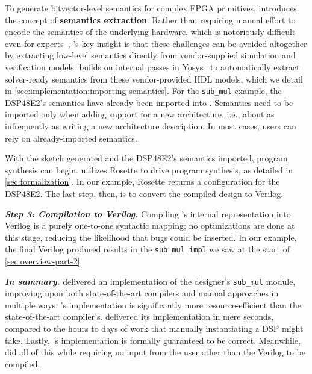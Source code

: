 To generate bitvector-level semantics
  for complex FPGA primitives,
  \lr introduces the concept of
  \textbf{semantics extraction}.
Rather than requiring
  manual effort to encode the semantics
  of the underlying hardware,
  which is notoriously difficult
  even for experts~\cite{Bernstein2021WhatAT},
  \lr's key insight is that these challenges
  can be avoided altogether
  by extracting low-level semantics
  directly from
  vendor-supplied simulation and verification models.
\lr builds on internal passes in 
  Yosys~\cite{wolf2013yosys} 
  to automatically extract
  solver-ready semantics from these vendor-provided HDL models,
  which we detail in \cref{sec:implementation:importing-semantics}.
For the
  \texttt{sub\_mul} example,
  the DSP48E2's semantics have already been imported into \lr.
Semantics need to be imported only when
  adding support for a new architecture, i.e., %
  about as infrequently
  as writing a new architecture description.
In most cases,
  \lr users can rely on already-imported semantics.
  
With the sketch generated
  and the DSP48E2's semantics imported,
  program synthesis can begin.
\lr utilizes Rosette to drive program synthesis,
  as detailed in \cref{sec:formalization}.
In our example, Rosette returns
  a configuration for the DSP48E2.
The last step, then, is to convert
  the compiled design
  to Verilog.
  
\textit{\textbf{Step 3: Compilation to Verilog.}}
Compiling \lr's internal representation into Verilog
  is a purely 
  one-to-one syntactic mapping;
  no optimizations are done at this stage,
  reducing the likelihood that bugs could be inserted.
In our example,
  the final Verilog produced
  results in the
  \texttt{sub\_mul\_impl}
  we saw at the start of \cref{sec:overview-part-2}.

\textit{\textbf{In summary.}}
\lr
  delivered 
  an implementation
  of the designer's
  \texttt{sub\_mul}
  module,
  improving upon both state-of-the-art compilers
  and manual approaches
  in multiple ways.
\lr's implementation
  is significantly more resource-efficient
  than the state-of-the-art compiler's.
\lr delivered its implementation
  in mere seconds,
  compared to the hours to days
  of work
  that manually instantiating
  a DSP might take.
Lastly,
  \lr's implementation
  is formally guaranteed to be correct.
Meanwhile, \lr did all of this
  while requiring no input from the user
  other than the Verilog to be compiled.


